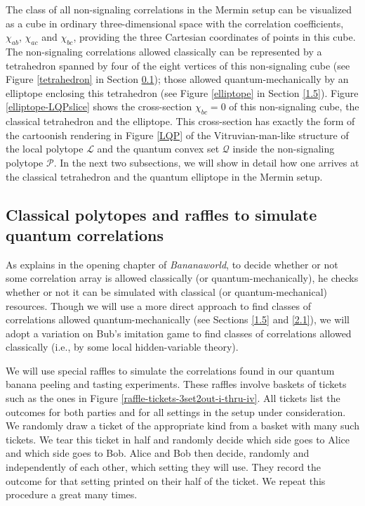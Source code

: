 The class of all non-signaling correlations in the Mermin setup can be visualized as a cube in ordinary three-dimensional space with the correlation coefficients, $\chi_{ab}$, $\chi_{ac}$ and $\chi_{bc}$, providing the three Cartesian coordinates of points in this cube. The non-signaling correlations allowed classically can be represented by a tetrahedron spanned by four of the eight vertices of this non-signaling cube (see Figure \ref{tetrahedron} in Section \ref{1.4}); those allowed quantum-mechanically by an elliptope enclosing this tetrahedron (see Figure \ref{elliptope} in Section \ref{1.5}). Figure \ref{elliptope-LQPslice} shows the cross-section $\chi_{bc} =0$ of this non-signaling cube, the classical tetrahedron and the elliptope. This cross-section has exactly the form of the cartoonish rendering in Figure \ref{LQP} of the Vitruvian-man-like structure of the local polytope $\mathcal{L}$ and the quantum convex set $\mathcal{Q}$ inside the non-signaling polytope $\mathcal{P}$. In the next two subsections, we will show in detail how one arrives at the classical tetrahedron and the quantum elliptope in the Mermin setup.

\subsection{Classical polytopes and raffles to simulate quantum correlations} \label{1.4}

As \citet[p.\ 10]{Bub 2016} explains in the opening chapter of \emph{Bananaworld}, to decide whether or not some correlation array is allowed classically (or quantum-mechanically), he checks whether or not it can be simulated with classical (or quantum-mechanical) resources. Though we will use a more direct approach to find classes of correlations allowed quantum-mechanically (see Sections  \ref{1.5} and \ref{2.1}), we will adopt a variation on Bub's imitation game to find classes of correlations allowed classically (i.e., by some local hidden-variable theory). 

We will use special raffles to simulate the correlations found in our quantum banana peeling and tasting experiments. These raffles involve baskets of tickets such as the ones in Figure \ref{raffle-tickets-3set2out-i-thru-iv}. All tickets list the outcomes for both parties and for all settings in the setup under consideration. We randomly draw a ticket of the appropriate kind from a basket with many such tickets. We tear this ticket in half and randomly decide which side goes to Alice and which side goes to Bob. Alice and Bob then decide, randomly and independently of each other, which setting they will use. They record the outcome for that setting printed on their half of the ticket. We repeat this procedure a great many times. 

